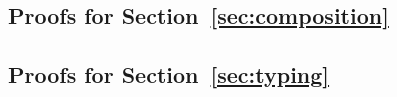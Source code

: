 \documentclass[a4paper, UKenglish, cleveref, autoref, thm-restate]{lipics-v2021}
\newenvironment{LibCode*}{%
  \begin{tcolorbox}[%
    colframe=white,%
    boxrule=0.0pt,%
    top=2.5pt,%
    left=2.5pt,%
    bottom=2.5pt,%
    right=2.5pt,%
    before skip=5pt,%
    after skip=5pt,%
    boxsep=0pt%
  ]
}{%
  \end{tcolorbox}%
}
\newcommand*\LibCode[1]{\begin{LibCode*}{#1}\end{LibCode*}}
\newcommand*\AppCode[1]{{#1}}
\begin{document}

  \subsection{Proofs for Section~\ref{sec:composition}}
  \LibCode\KCKitAp
  \LibCode\KCKitApProof

  \LibCode\KDistLiftCompose
  \LibCode\KDistLiftComposeProof

  \LibCode\KCommLiftWeaken
  \LibCode\KCommLiftWeakenProof

  \LibCode\KCommLiftWeakenTraverse
  \LibCode\KCommLiftWeakenTraverseProof

  \LibCode\KWeakenCancelsSingle
  \LibCode\KWeakenCancelsSingleProof

  \LibCode\KWeakenCancelsSingleTraverse
  \LibCode\KWeakenCancelsSingleTraverseProof

  \LibCode\KDistLiftSingle
  \LibCode\KDistLiftSingleProof

  \LibCode\KDistLiftSingleTraverse
  \LibCode\KDistLiftSingleTraverseProof




  \subsection{Proofs for Section~\ref{sec:typing}}
  \LibCode\KLiftTyping
  \LibCode\KLiftTypingProof

  \LibCode\KSingleTyping
  \LibCode\KSingleTypingProof










\end{document}

